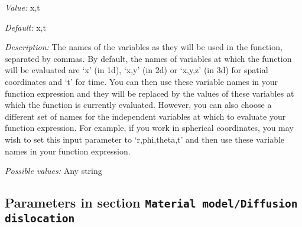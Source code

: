\begin{itemize}
{\it Value:} x,t


{\it Default:} x,t


{\it Description:} The names of the variables as they will be used in the function, separated by commas. By default, the names of variables at which the function will be evaluated are `x' (in 1d), `x,y' (in 2d) or `x,y,z' (in 3d) for spatial coordinates and `t' for time. You can then use these variable names in your function expression and they will be replaced by the values of these variables at which the function is currently evaluated. However, you can also choose a different set of names for the independent variables at which to evaluate your function expression. For example, if you work in spherical coordinates, you may wish to set this input parameter to `r,phi,theta,t' and then use these variable names in your function expression.


{\it Possible values:} Any string
\end{itemize}

\subsection{Parameters in section \tt Material model/Diffusion dislocation}
\label{parameters:Material_20model/Diffusion_20dislocation}

